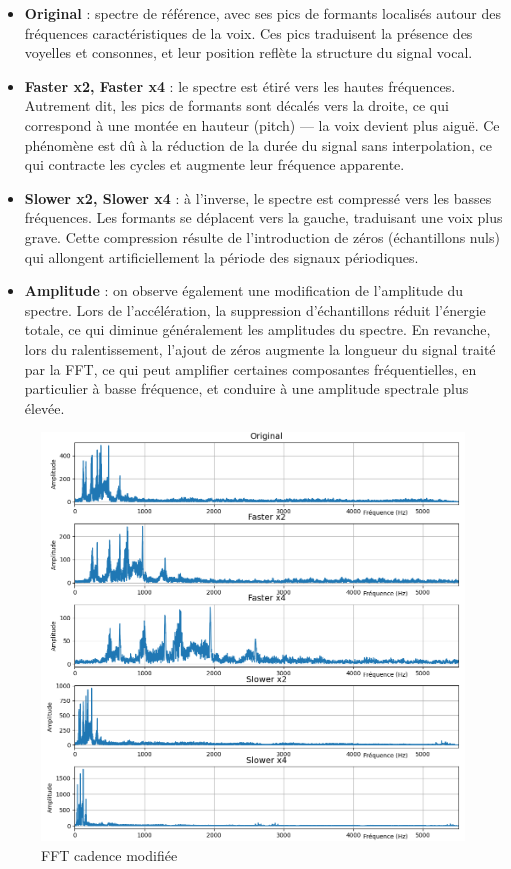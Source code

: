 \begin{itemize}
    \item \textbf{Original} : spectre de référence, avec ses pics de formants localisés autour des fréquences caractéristiques de la voix. Ces pics traduisent la présence des voyelles et consonnes, et leur position reflète la structure du signal vocal.
    
    \item \textbf{Faster x2, Faster x4} : le spectre est étiré vers les hautes fréquences. Autrement dit, les pics de formants sont décalés vers la droite, ce qui correspond à une montée en hauteur (pitch) — la voix devient plus aiguë. Ce phénomène est dû à la réduction de la durée du signal sans interpolation, ce qui contracte les cycles et augmente leur fréquence apparente.

    \item \textbf{Slower x2, Slower x4} : à l’inverse, le spectre est compressé vers les basses fréquences. Les formants se déplacent vers la gauche, traduisant une voix plus grave. Cette compression résulte de l’introduction de zéros (échantillons nuls) qui allongent artificiellement la période des signaux périodiques.

    \item \textbf{Amplitude} : on observe également une modification de l'amplitude du spectre. Lors de l'accélération, la suppression d’échantillons réduit l’énergie totale, ce qui diminue généralement les amplitudes du spectre. En revanche, lors du ralentissement, l’ajout de zéros augmente la longueur du signal traité par la FFT, ce qui peut amplifier certaines composantes fréquentielles, en particulier à basse fréquence, et conduire à une amplitude spectrale plus élevée.
\end{itemize}

\begin{figure}[h!]
    \centering
    \includegraphics[width=17cm]{screenshots/fft_cadence.png}
    \caption{FFT cadence modifiée}
    \label{fig:cadence_fft}
\end{figure}

